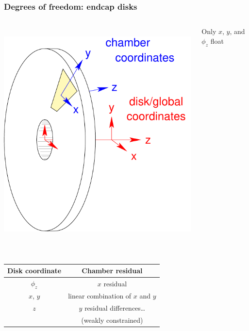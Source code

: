 \documentclass[compress]{beamer}
\begin{document}
\begin{frame}
\frametitle{Degrees of freedom: endcap disks}
\begin{columns}
\mbox{ } \hspace{0.5 cm} \includegraphics[height=4 cm]{disk_parameters.pdf}
\begin{center}
Only $x$, $y$, and $\phi_z$ float

\vspace{1 cm}
\mbox{ }
\end{center}
\end{columns}

\vspace{-0.7 cm}
\mbox{ } \hfill \renewcommand{\arraystretch}{1.2} \begin{tabular}{c c}
Disk coordinate & Chamber residual \\\hline\hline
$\phi_z$ & $x$ residual \\
$x$, $y$ & linear combination of $x$ and $y$ \\\hline
$z$ & $y$ residual differences\ldots \\
& (weakly constrained)
\end{tabular}
\end{frame}
\end{document}
